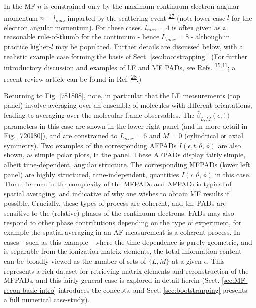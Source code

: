 \documentclass[10pt]{article}
\begin{document}
In the MF $n$ is constrained only by the maximum continuum electron angular momentum $n=l_{max}$ imparted by the scattering event \textsuperscript{\hyperref[csl:27]{27}} (note lower-case $l$ for the electron angular momentum). For these cases, $l_{max}=4$ is often given as a reasonable rule-of-thumb for the continuum - hence $L_{max}=8$ - although in practice higher-$l$ may be populated. Further details are discussed below, with a realistic example case forming the basis of Sect. \ref{sec:bootstrapping}. (For further introductory discussion and examples of LF and MF PADs, see Refs. \textsuperscript{\hyperref[csl:15]{15},\hyperref[csl:11]{11}}; a recent review article can be found in Ref. \textsuperscript{\hyperref[csl:28]{28}}.)


Returning to Fig. \ref{781808}, note, in particular that the LF measurements (top panel) involve averaging over an ensemble of molecules with different orientations, leading to averaging over the molecular frame observables. The $\bar{\beta}_{L,M}(\epsilon,t)$ parameters in this case are shown in the lower right panel (and in more detail in Fig. \ref{720080}), and are constrained to $L_{max}=6$ and $M=0$ (cylindrical or axial symmetry). Two examples of the corresponding AFPADs $\bar{I}(\epsilon,t,\theta,\phi)$ are also shown, as simple polar plots, in the panel. These AFPADs display fairly simple, albeit time-dependent, angular structure. 
The corresponding MFPADs (lower left panel) are highly structured,  time-independent, quantities $I(\epsilon,\theta,\phi)$ in this case. The difference in the complexity of the MFPADs and AFPADs is typical of spatial averaging, and indicative of why one wishes to obtain MF results if possible. Crucially, these types of process are coherent, and the PADs are sensitive to the (relative) phases of the continuum electrons. PADs may also respond to other phase contributions depending on the type of experiment, for example the spatial averaging in an AF measurement is a coherent process.
In cases - such as this example - where the time-dependence is purely geometric, and is separable from the ionization matrix elements, the total information content can be broadly viewed as the number of sets of $\{L,M\}$ at a given $\epsilon$. 
This represents a rich dataset for retrieving matrix elements and reconstruction of the MFPADs, and this fairly general case is explored in detail herein (Sect. \ref{sec:MF-recon-basic-intro} introduces the concepts, and Sect. \ref{sec:bootstrapping} presents a full numerical case-study). 
\end{document}
